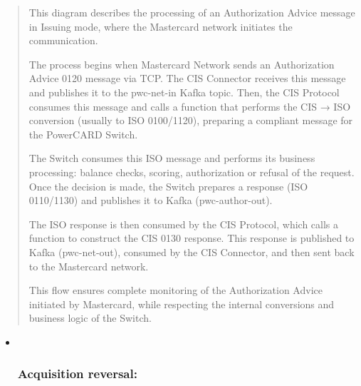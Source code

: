 \documentclass[12pt,a4paper]{report}
\begin{document}
\begin{quote}
This diagram describes the processing of an Authorization Advice message
in Issuing mode, where the Mastercard network initiates the
communication.

The process begins when Mastercard Network sends an Authorization Advice
0120 message via TCP. The CIS Connector receives this message and
publishes it to the pwc-net-in Kafka topic. Then, the CIS Protocol
consumes this message and calls a function that performs the CIS → ISO
conversion (usually to ISO 0100/1120), preparing a compliant message for
the PowerCARD Switch.

The Switch consumes this ISO message and performs its business
processing: balance checks, scoring, authorization or refusal of the
request. Once the decision is made, the Switch prepares a response (ISO
0110/1130) and publishes it to Kafka (pwc-author-out).

The ISO response is then consumed by the CIS Protocol, which calls a
function to construct the CIS 0130 response. This response is published
to Kafka (pwc-net-out), consumed by the CIS Connector, and then sent
back to the Mastercard network.

This flow ensures complete monitoring of the Authorization Advice
initiated by Mastercard, while respecting the internal conversions and
business logic of the Switch.
\end{quote}

\begin{itemize}
\item ~
  \hypertarget{acquisition-reversal}{%
  \subsubsection{\texorpdfstring{\textbf{Acquisition
  reversal:}}{Acquisition reversal:}}\label{acquisition-reversal}}
\end{itemize}
\end{document}
